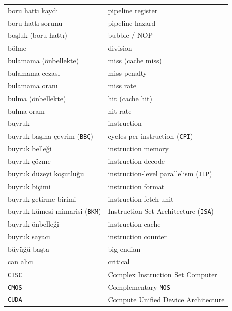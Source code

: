 {\begin{longtable}{@{}p{7.6cm}p{7.6cm}@{}}
boru hattı kaydı & pipeline register \\
boru hattı sorunu & pipeline hazard \\
boşluk (boru hattı) & bubble / NOP \\
bölme & division \\
bulamama (önbellekte) & miss (cache miss) \\
bulamama cezası & miss penalty \\
bulamama oranı & miss rate \\
bulma (önbellekte) & hit (cache hit) \\
bulma oranı & hit rate \\
buyruk & instruction \\
buyruk başına çevrim (\texttt{BBÇ}) & cycles per instruction (\texttt{CPI}) \\
buyruk belleği & instruction memory \\
buyruk çözme & instruction decode \\
buyruk düzeyi koşutluğu & instruction-level parallelism (\texttt{ILP}) \\
buyruk biçimi & instruction format \\
buyruk getirme birimi & instruction fetch unit \\
buyruk kümesi mimarisi (\texttt{BKM}) & Instruction Set Architecture (\texttt{ISA}) \\
buyruk önbelleği & instruction cache \\
buyruk sayacı & instruction counter \\
büyüğü başta & big-endian \\

can alıcı & critical \\
\texttt{CISC} & Complex Instruction Set Computer \\
\texttt{CMOS} & Complementary \texttt{MOS} \\
\texttt{CUDA} & Compute Unified Device Architecture \\


\end{longtable}}
